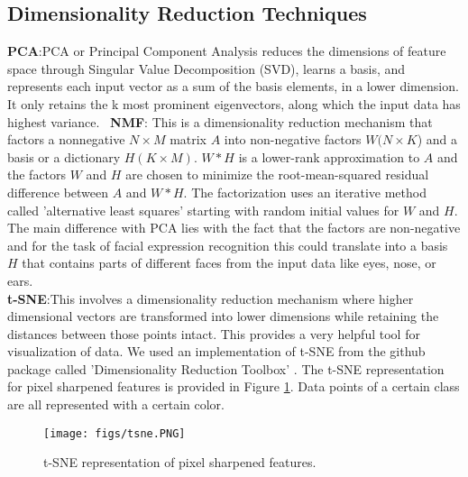 \documentclass[10pt,twocolumn,letterpaper]{article}
\begin{document}
\subsection{Dimensionality Reduction Techniques}
\textbf{PCA}:PCA or Principal Component Analysis reduces the dimensions of feature space through Singular Value Decomposition (SVD), learns a basis, and represents each input vector as a sum of the basis elements, in a lower dimension. It only retains the k most prominent eigenvectors, along which the input data has highest variance. \newline 
\
  \textbf{NMF}: This is a dimensionality reduction mechanism that factors a nonnegative $N \times M$ matrix $A$ into non-negative factors $W(N \times K$) and a basis or a dictionary $H(K \times M)$.  $W*H$ is a lower-rank approximation to $A$ and the factors $W$ and $H$ are chosen to minimize the root-mean-squared residual difference between $A$ and $W*H$. The factorization uses an iterative method called 'alternative least squares' starting with random initial values for $W$ and $H$. The main difference with PCA lies with the fact that the factors are non-negative and for the task of facial expression recognition this could translate into a basis $H$ that contains parts of different faces from the input data like eyes, nose, or ears.\newline
  \\
\textbf{t-SNE}:This involves a dimensionality reduction mechanism where higher dimensional vectors are transformed into lower dimensions while retaining the distances between those points intact. This provides a very helpful tool for visualization of data. We used an implementation of t-SNE from the github package called 'Dimensionality Reduction Toolbox' \cite{drtoolbox}. The t-SNE representation for pixel sharpened features is provided in Figure \ref{fig:tsne}. Data points of a certain class are all represented with a certain color. \newline

\begin{figure}[h]
\texttt{[image: figs/tsne.PNG]}
\caption{t-SNE representation of pixel sharpened features.}
\label{fig:tsne}
\end{figure}
\end{document}
